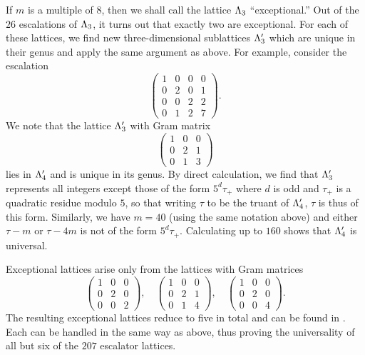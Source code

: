 If \(m\) is a multiple of \(8\), then we shall call the lattice \(\Lambda_3\)
``exceptional.'' Out of the \(26\) escalations of \(\Lambda_3\), it turns out
that exactly two are exceptional. For each of these lattices, we find new
three-dimensional sublattices \(\Lambda_3'\) which are unique in their genus
and apply the same argument as above. For example, consider the escalation
\[
    \begin{pmatrix}
        1 & 0 & 0 & 0 \\
        0 & 2 & 0 & 1 \\
        0 & 0 & 2 & 2 \\
        0 & 1 & 2 & 7
    \end{pmatrix}.
\]
We note that the lattice \(\Lambda_3'\) with Gram matrix
\[
    \begin{pmatrix}
        1 & 0 & 0 \\
        0 & 2 & 1 \\
        0 & 1 & 3
    \end{pmatrix}
\]
lies in \(\Lambda'_4\) and is unique in its genus. By direct calculation, we
find that \(\Lambda_3'\) represents all integers except those of the form
\(5^d\tau_{+}\) where \(d\) is odd and \(\tau_{+}\) is a quadratic residue
modulo \(5\), so that writing \(\tau\) to be the truant of \(\Lambda_4'\),
\(\tau\) is thus of this form. Similarly, we have \(m = 40\) (using the same
notation above) and either \(\tau - m\) or \(\tau - 4m\) is not of the form
\(5^d\tau_{+}\). Calculating up to \(160\) shows that \(\Lambda_4'\) is
universal. 

Exceptional lattices arise only from the lattices with Gram matrices
\[
    \begin{pmatrix}
        1 & 0 & 0 \\
        0 & 2 & 0 \\
        0 & 0 & 2
    \end{pmatrix}, \quad
    \begin{pmatrix}
        1 & 0 & 0 \\
        0 & 2 & 1 \\
        0 & 1 & 4
    \end{pmatrix}, \quad
    \begin{pmatrix}
        1 & 0 & 0 \\
        0 & 2 & 0 \\
        0 & 0 & 4
    \end{pmatrix}.
\]
The resulting exceptional lattices reduce to five in total and can be found in
\cite[Table~2]{bhargava2000conway}. Each can be handled in the same way as
above, thus proving the universality of all but six of the \(207\) escalator
lattices.


